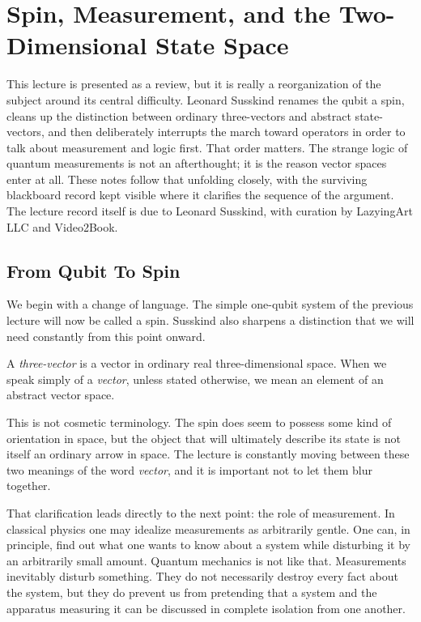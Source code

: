\chapter{Spin, Measurement, and the Two-Dimensional State Space}

This lecture is presented as a review, but it is really a reorganization of the subject around its central difficulty. Leonard Susskind renames the qubit a spin, cleans up the distinction between ordinary three-vectors and abstract state-vectors, and then deliberately interrupts the march toward operators in order to talk about measurement and logic first. That order matters. The strange logic of quantum measurements is not an afterthought; it is the reason vector spaces enter at all. These notes follow that unfolding closely, with the surviving blackboard record kept visible where it clarifies the sequence of the argument. The lecture record itself is due to Leonard Susskind, with curation by LazyingArt LLC and Video2Book.

\section{From Qubit To Spin}

We begin with a change of language. The simple one-qubit system of the previous lecture will now be called a spin. Susskind also sharpens a distinction that we will need constantly from this point onward.

\begin{definition}
A \emph{three-vector} is a vector in ordinary real three-dimensional space. When we speak simply of a \emph{vector}, unless stated otherwise, we mean an element of an abstract vector space.
\end{definition}

This is not cosmetic terminology. The spin does seem to possess some kind of orientation in space, but the object that will ultimately describe its state is not itself an ordinary arrow in space. The lecture is constantly moving between these two meanings of the word \emph{vector}, and it is important not to let them blur together.

That clarification leads directly to the next point: the role of measurement. In classical physics one may idealize measurements as arbitrarily gentle. One can, in principle, find out what one wants to know about a system while disturbing it by an arbitrarily small amount. Quantum mechanics is not like that. Measurements inevitably disturb something. They do not necessarily destroy every fact about the system, but they do prevent us from pretending that a system and the apparatus measuring it can be discussed in complete isolation from one another.

